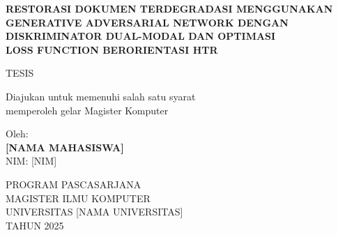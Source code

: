 \documentclass[12pt,a4paper]{report}
\begin{document}
\begin{titlepage}
\centering
\vspace*{2cm}

{\Large\bfseries RESTORASI DOKUMEN TERDEGRADASI MENGGUNAKAN\\
GENERATIVE ADVERSARIAL NETWORK DENGAN\\
DISKRIMINATOR DUAL-MODAL DAN OPTIMASI\\
LOSS FUNCTION BERORIENTASI HTR}

\vspace{2cm}

{\large TESIS}

\vspace{1cm}

{\normalsize Diajukan untuk memenuhi salah satu syarat\\
memperoleh gelar Magister Komputer}

\vfill

{\normalsize Oleh:}\\[0.5cm]
{\large\bfseries [NAMA MAHASISWA]}\\
{\normalsize NIM: [NIM]}

\vfill

{\normalsize PROGRAM PASCASARJANA\\
MAGISTER ILMU KOMPUTER\\
UNIVERSITAS [NAMA UNIVERSITAS]\\
TAHUN 2025}

\end{titlepage}

\tableofcontents
\newpage

\listoffigures
\newpage

\listoftables
\newpage




\end{document}
